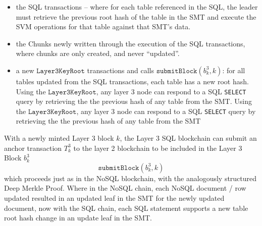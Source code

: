 \documentclass{article}
\newcommand{\blockhash}[2]{b^{#1}_{#2}}
\newcommand{\transaction}[2]{T_{#2}^#1}
\newcommand{\submitblock}[2]{\texttt{submitBlock}(#2, #1)}
\newcommand{\sql}[1]{\texttt{#1}}
\begin{document}
\begin{itemize}
\item the SQL transactions -- where for each table referenced in the SQL, the leader must retrieve the previous root hash of the table in the SMT and execute the SVM operations for that table against that SMT's data.   

\item the Chunks newly written through the execution of the SQL transactions, where chunks are only created, and never ``updated''.   

\item a  new $\texttt{Layer3KeyRoot}$  transactions and calls $\submitblock{k}{\blockhash{3}{k}}$: for all tables updated from the SQL transactions, each table has a new root hash. 
Using the $\texttt{Layer3KeyRoot}$, any layer 3 node can respond to a SQL \sql{SELECT} query by retrieving the the previous hash of any table from the SMT.
Using the $\texttt{Layer3KeyRoot}$, any layer 3 node can respond to a SQL \sql{SELECT} query by retrieving the the previous hash of any table from the SMT 

\end{itemize}
With a newly minted Layer 3 block $k$, the Layer 3 SQL blockchain can submit an anchor transaction $\transaction{3}{k}$ to the layer 2 blockchain to be included in the Layer 3 Block $\blockhash{3}{k}$
\[
\submitblock{k}{\blockhash{3}{k}}
\]
which proceeds just as in the NoSQL blockchain, with the analogously structured Deep Merkle Proof.  Where in the NoSQL chain, each NoSQL document / row updated resulted in an updated leaf in the SMT for the newly updated document, now with the SQL chain, each SQL statement supports a new table root hash change in an update leaf in the SMT.  
 
\end{document}

